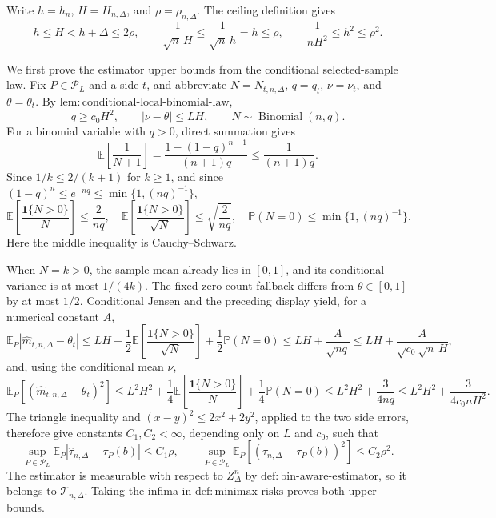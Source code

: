Write \(h=h_n\), \(H=H_{n,\Delta}\), and \(\rho=\rho_{n,\Delta}\).  The ceiling definition gives
\[
 h\le H<h+\Delta\le2\rho,
 \qquad
 \frac1{\sqrt n\,H}\le\frac1{\sqrt n\,h}=h\le\rho,
 \qquad
 \frac1{nH^2}\le h^2\le\rho^2.
\]

We first prove the estimator upper bounds from the conditional selected-sample law.  Fix \(P\in\mathcal P_L\) and a side \(t\), and abbreviate \(N=N_{t,n,\Delta}\), \(q=q_t\), \(\nu=\nu_t\), and \(\theta=\theta_t\).  By \(\mathrm{lem:conditional\text{-}local\text{-}binomial\text{-}law}\),
\[
 q\ge c_0H^2,
 \qquad |\nu-\theta|\le LH,
 \qquad N\sim\operatorname{Binomial}(n,q).
\]
For a binomial variable with \(q>0\), direct summation gives
\[
 \mathbb E\!\left[\frac1{N+1}\right]
 =\frac{1-(1-q)^{n+1}}{(n+1)q}
 \le\frac1{(n+1)q}.
\]
Since \(1/k\le2/(k+1)\) for \(k\ge1\), and since \((1-q)^n\le e^{-nq}\le\min\{1,(nq)^{-1}\}\),
\[
 \mathbb E\!\left[\frac{\mathbf1\{N>0\}}N\right]\le\frac2{nq},
 \quad
 \mathbb E\!\left[\frac{\mathbf1\{N>0\}}{\sqrt N}\right]\le\sqrt{\frac2{nq}},
 \quad
 \mathbb P(N=0)\le\min\{1,(nq)^{-1}\}.
\]
Here the middle inequality is Cauchy--Schwarz.

When \(N=k>0\), the sample mean already lies in \([0,1]\), and its conditional variance is at most \(1/(4k)\).  The fixed zero-count fallback differs from \(\theta\in[0,1]\) by at most \(1/2\).  Conditional Jensen and the preceding display yield, for a numerical constant \(A\),
\[
 \mathbb E_P|\widehat m_{t,n,\Delta}-\theta_t|
 \le LH+\frac12\mathbb E\!\left[\frac{\mathbf1\{N>0\}}{\sqrt N}\right]
       +\frac12\mathbb P(N=0)
 \le LH+\frac{A}{\sqrt{nq}}
 \le LH+\frac{A}{\sqrt{c_0}\sqrt n\,H},
\]
and, using the conditional mean \(\nu\),
\[
 \mathbb E_P[(\widehat m_{t,n,\Delta}-\theta_t)^2]
 \le L^2H^2+\frac14\mathbb E\!\left[\frac{\mathbf1\{N>0\}}N\right]
       +\frac14\mathbb P(N=0)
 \le L^2H^2+\frac{3}{4nq}
 \le L^2H^2+\frac{3}{4c_0nH^2}.
\]
The triangle inequality and \((x-y)^2\le2x^2+2y^2\), applied to the two side errors, therefore give constants \(C_1,C_2<\infty\), depending only on \(L\) and \(c_0\), such that
\[
 \sup_{P\in\mathcal P_L}\mathbb E_P|\widehat\tau_{n,\Delta}-\tau_P(b)|
 \le C_1\rho,
 \qquad
 \sup_{P\in\mathcal P_L}\mathbb E_P[(\widehat\tau_{n,\Delta}-\tau_P(b))^2]
 \le C_2\rho^2.
\]
The estimator is measurable with respect to \(Z_\Delta^n\) by \(\mathrm{def:bin\text{-}aware\text{-}estimator}\), so it belongs to \(\mathcal T_{n,\Delta}\).  Taking the infima in \(\mathrm{def:minimax\text{-}risks}\) proves both upper bounds.

